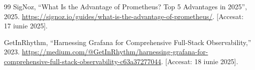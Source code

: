 \documentclass{thesis.cs.pub.ro}
\begin{document}
\begin{thebibliography}{99}
 \label{bib:prometheusAdv}
SigNoz, “What Is the Advantage of Prometheus? Top 5 Advantages in 2025”, 2025. \href{https://signoz.io/guides/what-is-the-advantage-of-prometheus/}
{https://signoz.io/guides/what-is-the-advantage-of-prometheus/}.
[Accesat: 17 iunie 2025].

 \label{bib:grafanaObs}
GetInRhythm, “Harnessing Grafana for Comprehensive Full-Stack Observability,” 2023.
\href{https://medium.com/@GetInRhythm/harnessing-grafana-for-comprehensive-full-stack-observability-c63a37277044}
{https://medium.com/@GetInRhythm/harnessing-grafana-for-comprehensive-full-stack-observability-c63a37277044}. [Accesat: 18 iunie 2025].

\end{thebibliography}


\printindex
\end{document}
